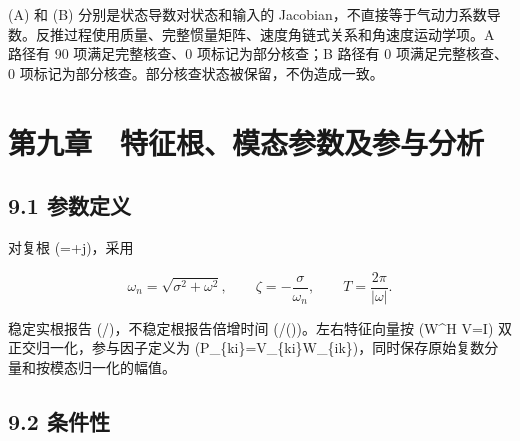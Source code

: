 \documentclass[UTF8,11pt,oneside,openany,fontset=windows]{ctexbook}
\begin{document}
(\mathbf A) 和 (\mathbf B) 分别是状态导数对状态和输入的
Jacobian，不直接等于气动力系数导数。反推过程使用质量、完整惯量矩阵、速度角链式关系和角速度运动学项。A
路径有 90 项满足完整核查、0 项标记为部分核查；B 路径有 0
项满足完整核查、0 项标记为部分核查。部分核查状态被保留，不伪造成一致。

\chapter{第九章　特征根、模态参数及参与分析}\label{ux7b2cux4e5dux7ae0-ux7279ux5f81ux6839ux6a21ux6001ux53c2ux6570ux53caux53c2ux4e0eux5206ux6790}

\section{9.1 参数定义}\label{ux53c2ux6570ux5b9aux4e49}

对复根 (\lambda=\sigma+j\omega)，采用

\[
\omega_n=\sqrt{\sigma^2+\omega^2},\qquad
\zeta=-\frac{\sigma}{\omega_n},\qquad
T=\frac{2\pi}{|\omega|}.
\]

稳定实根报告 (/\lambda)，不稳定根报告倍增时间
(/\Re(\lambda))。左右特征向量按 (W\^{}H V=I)
双正交归一化，参与因子定义为
(P\_\{ki\}=V\_\{ki\}W\_\{ik\})，同时保存原始复数分量和按模态归一化的幅值。

\section{9.2 条件性}\label{ux6761ux4ef6ux6027}
\end{document}
